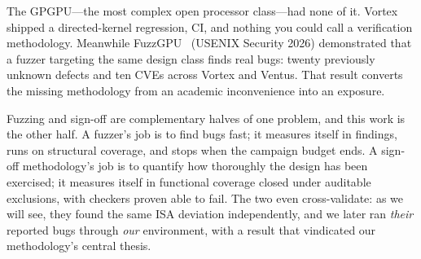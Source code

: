 \documentclass[conference]{IEEEtran}
\begin{document}
The GPGPU---the most complex open processor class---had none of it.
Vortex shipped a directed-kernel regression, CI, and nothing you
could call a verification methodology. Meanwhile FuzzGPU~\cite{fuzzgpu}
(USENIX Security 2026) demonstrated that a fuzzer targeting the same
design class finds real bugs: twenty previously unknown defects and
ten CVEs across Vortex and Ventus. That result converts the missing
methodology from an academic inconvenience into an exposure.

Fuzzing and sign-off are complementary halves of one problem, and
this work is the other half. A fuzzer's job is to find bugs fast; it
measures itself in findings, runs on structural coverage, and stops
when the campaign budget ends. A sign-off methodology's job is to
quantify how thoroughly the design has been exercised; it measures
itself in functional coverage closed under auditable exclusions,
with checkers proven able to fail. The two even cross-validate: as we
will see, they found the same ISA deviation independently, and we
later ran \emph{their} reported bugs through \emph{our} environment,
with a result that vindicated our methodology's central thesis.
\end{document}
